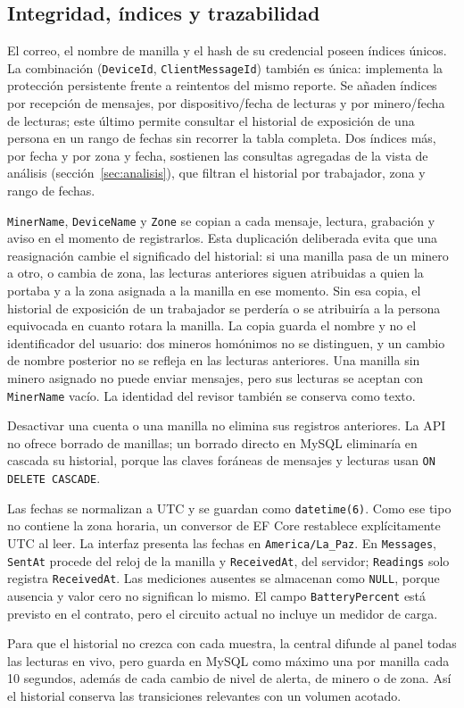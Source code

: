 \documentclass[10pt,a4paper]{article}
\newcommand{\code}[1]{{\small\urlstyle{tt}\nolinkurl{#1}}}
\begin{document}
\subsection{Integridad, índices y trazabilidad}
El correo, el nombre de manilla y el hash de su credencial poseen índices únicos. La combinación (\code{DeviceId}, \code{ClientMessageId}) también es única: implementa la protección persistente frente a reintentos del mismo reporte. Se añaden índices por recepción de mensajes, por dispositivo/fecha de lecturas y por minero/fecha de lecturas; este último permite consultar el historial de exposición de una persona en un rango de fechas sin recorrer la tabla completa. Dos índices más, por fecha y por zona y fecha, sostienen las consultas agregadas de la vista de análisis (sección~\ref{sec:analisis}), que filtran el historial por trabajador, zona y rango de fechas.

\code{MinerName}, \code{DeviceName} y \code{Zone} se copian a cada mensaje, lectura, grabación y aviso en el momento de registrarlos. Esta duplicación deliberada evita que una reasignación cambie el significado del historial: si una manilla pasa de un minero a otro, o cambia de zona, las lecturas anteriores siguen atribuidas a quien la portaba y a la zona asignada a la manilla en ese momento. Sin esa copia, el historial de exposición de un trabajador se perdería o se atribuiría a la persona equivocada en cuanto rotara la manilla. La copia guarda el nombre y no el identificador del usuario: dos mineros homónimos no se distinguen, y un cambio de nombre posterior no se refleja en las lecturas anteriores. Una manilla sin minero asignado no puede enviar mensajes, pero sus lecturas se aceptan con \code{MinerName} vacío. La identidad del revisor también se conserva como texto.\par Desactivar una cuenta o una manilla no elimina sus registros anteriores. La API no ofrece borrado de manillas; un borrado directo en MySQL eliminaría en cascada su historial, porque las claves foráneas de mensajes y lecturas usan \code{ON DELETE CASCADE}.

Las fechas se normalizan a UTC y se guardan como \code{datetime(6)}. Como ese tipo no contiene la zona horaria, un conversor de EF Core restablece explícitamente UTC al leer. La interfaz presenta las fechas en \code{America/La_Paz}. En \code{Messages}, \code{SentAt} procede del reloj de la manilla y \code{ReceivedAt}, del servidor; \code{Readings} solo registra \code{ReceivedAt}. Las mediciones ausentes se almacenan como \code{NULL}, porque ausencia y valor cero no significan lo mismo. El campo \code{BatteryPercent} está previsto en el contrato, pero el circuito actual no incluye un medidor de carga.\par Para que el historial no crezca con cada muestra, la central difunde al panel todas las lecturas en vivo, pero guarda en MySQL como máximo una por manilla cada 10 segundos, además de cada cambio de nivel de alerta, de minero o de zona. Así el historial conserva las transiciones relevantes con un volumen acotado.
\end{document}
